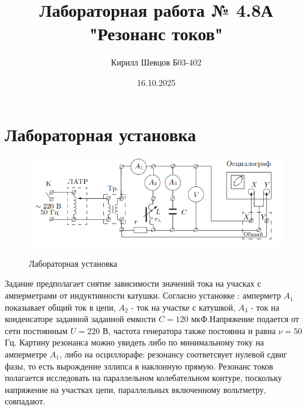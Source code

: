 \documentclass[a4paper, 12pt]{article}
\title{Лабораторная работа № 4.8А "Резонанс токов"}
\author{Кирилл Шевцов Б03-402}
\date{16.10.2025}
\begin{document}
\maketitle
\section*{Лабораторная установка}
\begin{figure}[htbp]
    \centering
    \includegraphics[width=0.7\linewidth]{equip.png}
    \label{Лабораторная установка}
    \caption{Лабораторная установка}
\end{figure}
Задание предполагает снятие зависимости значений тока на учасках с амперметрами от индуктивности катушки.
Согласно установке : амперметр $A_{1}$ показывает общий ток в цепи, $A_{2}$ - ток на участке с катушкой, $A_{3}$ - ток на конденсаторе заданной
заданной емкости $C = 120$ мкФ.\newline Напряжение подается от сети постоянным $U = 220$ В, частота генератора также постоянна и равна $\nu = 50$ Гц.\newline
Картину резонанса можно увидеть либо по минимальному току на амперметре $A_{1}$, либо на осциллорафе: резонансу соответсвует нулевой сдвиг фазы,
то есть вырождение эллипса в наклонную прямую.\newline
Резонанс токов полагается исследовать на параллельном колебательном контуре, поскольку напряжение на участках цепи, параллельных включенному
вольтметру, совпадают.
\end{document}
